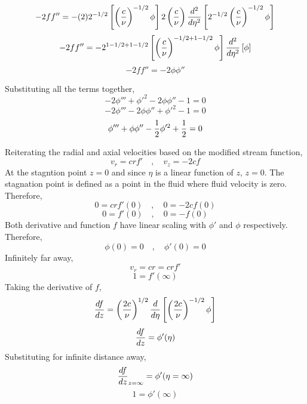 \documentclass[class=report, 12pt, crop=false]{standalone}
\begin{document}
\begin{center}
$$-2ff'' = -(2)2^{-1/2}\left[\left(\frac{c}{\nu}\right)^{-1/2}\phi\right]2\left(\frac{c}{\nu}\right)\frac{d^2}{d\eta^2}\left[2^{-1/2}\left(\frac{c}{\nu}\right)^{-1/2}\phi\right]$$
$$-2ff'' = -2^{1-1/2+1-1/2}\left[\left(\frac{c}{\nu}\right)^{-1/2+1-1/2}\phi\right]\frac{d^2}{d\eta^2}\left[\phi\right]$$
$$-2ff'' = -2\phi\phi''$$

Substituting all the terms together,
$$-2\phi''' + \phi'^2 - 2\phi\phi'' - 1 = 0$$
$$-2\phi''' - 2\phi\phi'' + \phi'^2 - 1 = 0$$
$$\phi''' + \phi\phi'' - \frac{1}{2}\phi'^2 + \frac{1}{2} = 0$$

Reiterating the radial and axial velocities based on the modified stream function,
$$v_r =  crf' \quad,\quad v_z = -2cf$$
At the stagntion point $z=0$ and since $\eta$ is a linear function of $z$, $z=0$. The stagnation point is defined as a point in the fluid where fluid velocity is zero. Therefore,
$$0 =  crf'(0) \quad,\quad 0 = -2cf(0)$$
$$0 =  f'(0) \quad,\quad 0 = -f(0)$$
Both derivative and function $f$ have linear scaling with $\phi'$ and $\phi$ respectively. Therefore,
$$\phi(0)=0 \quad,\quad \phi'(0) = 0$$
Infinitely far away,
$$v_r = cr = crf'$$
$$1 = f'(\infty)$$
Taking the derivative of $f$,
$$\frac{df}{dz} = \left(\frac{2c}{\nu}\right)^{1/2}\frac{d}{d\eta}\left[\left(\frac{2c}{\nu}\right)^{-1/2}\phi\right]$$
$$\frac{df}{dz} = \phi'(\eta)$$
Substituting for infinite distance away,
$$\frac{df}{dz}_{z=\infty} = \phi'(\eta=\infty)$$
$$1 = \phi'(\infty)$$

















\end{center}
\end{document}
